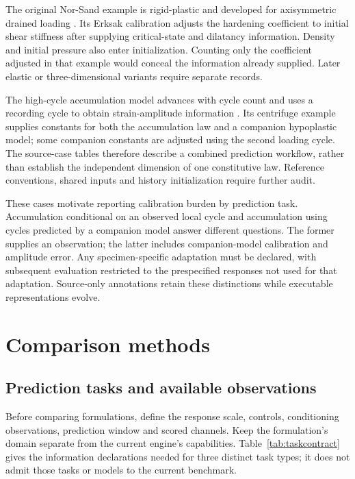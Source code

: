 \documentclass[11pt,a4paper]{article}
\begin{document}
The original Nor-Sand example is rigid-plastic and developed for axisymmetric drained loading \cite{norsand1993}. Its Erksak calibration adjusts the hardening coefficient to initial shear stiffness after supplying critical-state and dilatancy information. Density and initial pressure also enter initialization. Counting only the coefficient adjusted in that example would conceal the information already supplied. Later elastic or three-dimensional variants require separate records.

The high-cycle accumulation model advances with cycle count and uses a recording cycle to obtain strain-amplitude information \cite{hca2005}. Its centrifuge example supplies constants for both the accumulation law and a companion hypoplastic model; some companion constants are adjusted using the second loading cycle. The source-case tables therefore describe a combined prediction workflow, rather than establish the independent dimension of one constitutive law. Reference conventions, shared inputs and history initialization require further audit.

These cases motivate reporting calibration burden by prediction task. Accumulation conditional on an observed local cycle and accumulation using cycles predicted by a companion model answer different questions. The former supplies an observation; the latter includes companion-model calibration and amplitude error. Any specimen-specific adaptation must be declared, with subsequent evaluation restricted to the prespecified responses not used for that adaptation. Source-only annotations retain these distinctions while executable representations evolve.

\section{Comparison methods}
\subsection{Prediction tasks and available observations}
Before comparing formulations, define the response scale, controls, conditioning observations, prediction window and scored channels. Keep the formulation's domain separate from the current engine's capabilities. Table~\ref{tab:taskcontract} gives the information declarations needed for three distinct task types; it does not admit those tasks or models to the current benchmark.
\end{document}

